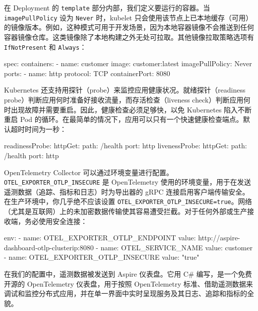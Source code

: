 \label{idx:1976}
在 Deployment 的 \texttt{template} 部分内部，我们定义要运行的容器。当 \texttt{image\allowbreak{}Pull\allowbreak{}Policy} 设为 \texttt{Never} 时，kubelet 只会使用该节点上已本地缓存（可用）的镜像版本。例如，这种模式可用于开发场景，因为本地容器镜像不会推送到任何容器镜像仓库。这类镜像除了本地构建之外无处可拉取。其他镜像拉取策略选项有 \texttt{If\allowbreak{}Not\allowbreak{}Present} 和 \texttt{Always}：

\begin{codebox}[yaml]
    spec:
      containers:
        - name: customer
          image: customer:latest
          imagePullPolicy: Never
          ports:
            - name: http
              protocol: TCP
              containerPort: 8080
\end{codebox}

Kubernetes 还支持用探针（probe）来监控应用健康状况。就绪探针（readiness probe）判断应用何时准备好接收流量，而存活检查（liveness check）判断应用何时出现故障并需要重启。因此，健康检查必须足够快，以免 Kubernetes 陷入不断重启 Pod 的循环。在最简单的情况下，应用可以只有一个快速健康检查端点。默认超时时间为一秒：

\begin{codebox}[yaml]
          readinessProbe:
            httpGet:
              path: /health
              port: http
          livenessProbe:
            httpGet:
              path: /health
              port: http
\end{codebox}

\label{idx:1977}
OpenTelemetry Collector 可以通过环境变量进行配置。\texttt{ OTEL\_\allowbreak{}EXPORTER\_\allowbreak{}OTLP\_\allowbreak{}INSECURE} 是 OpenTelemetry 使用的环境变量，用于在发送遥测数据（追踪、指标和日志）时为导出器的 gRPC 连接启用客户端传输安全。在生产环境中，你几乎绝不应该设置 \texttt{OTEL\_\allowbreak{}EXPORTER\_\allowbreak{}OTLP\_\allowbreak{}INSECURE=\allowbreak{}true}。网络（尤其是互联网）上的未加密数据传输使其容易遭受拦截。对于任何外部或生产接收端，务必使用安全连接：

\begin{codebox}[yaml]
          env:
            - name: OTEL_EXPORTER_OTLP_ENDPOINT
              value: http://aspire-dashboard-otlp-clusterip:8080
            - name: OTEL_SERVICE_NAME
              value: customer
            - name: OTEL_EXPORTER_OTLP_INSECURE
              value: "true"
\end{codebox}

在我们的配置中，遥测数据被发送到 Aspire 仪表盘。它用 C\# 编写，是一个免费开源的 OpenTelemetry 仪表盘，用于按照 OpenTelemetry 标准、借助遥测数据来调试和监控分布式应用，并在单一界面中实时呈现服务及其日志、追踪和指标的全貌。

